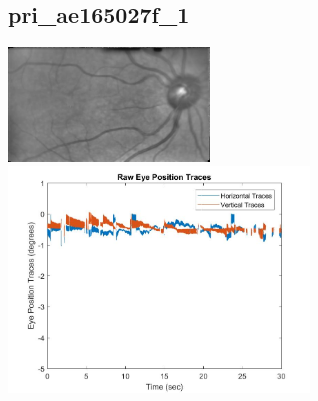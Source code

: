 \documentclass[11pt]{article}
\begin{document}
\subsection{pri\_ae165027f\_1}
\includegraphics[width=0.40\textwidth, valign=m]{referenceframes/rodenstock_amblyopes/pri_ae165027f_1_dwt_nostim_gamscaled_bandfilt_refframe.jpg}
\includegraphics[width=0.60\textwidth, valign=m]{eyepositiontraces/rodenstock_amblyopes/pri_ae165027f_1.jpg}\\
\end{document}
